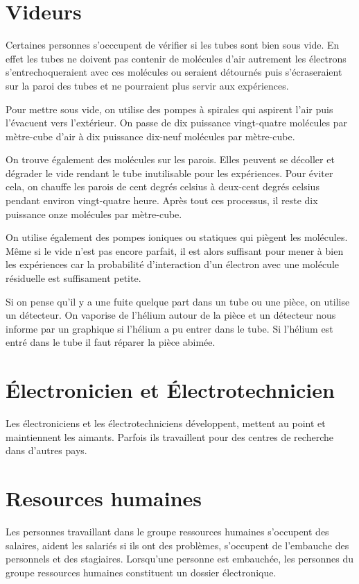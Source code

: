 		\section{Videurs}
			 Certaines personnes s'occcupent de vérifier si les tubes sont bien sous vide. En effet les tubes ne doivent pas contenir de molécules d'air autrement les électrons s'entrechoqueraient avec ces molécules ou seraient détournés puis s'écraseraient sur la paroi des tubes et ne pourraient plus servir aux expériences.
			
			\par Pour mettre sous vide, on utilise des pompes à spirales qui aspirent l'air puis l'évacuent vers l'extérieur. On passe de dix puissance vingt-quatre molécules par mètre-cube d'air à dix puissance dix-neuf molécules par mètre-cube. 
			\par On trouve également des molécules sur les parois. Elles peuvent se décoller et dégrader le vide rendant le tube inutilisable pour les expériences. Pour éviter cela, on chauffe les parois de cent degrés celsius à deux-cent degrés celsius pendant environ vingt-quatre heure. Après tout ces processus, il reste dix puissance onze molécules par mètre-cube. 
			\par On utilise également des pompes ioniques ou statiques qui piègent les molécules. Même si le vide n'est pas encore parfait, il est alors suffisant pour mener à bien les expériences car la probabilité d'interaction d'un électron avec une molécule résiduelle est suffisament petite. 

			\par Si on pense qu'il y a une fuite quelque part dans un tube ou une pièce, on utilise un détecteur. On vaporise de l'hélium autour de la pièce et un détecteur nous informe par un graphique si l'hélium a pu entrer dans le tube. Si l'hélium est entré dans le tube il faut réparer la pièce abimée.  
		
		\section{Électronicien et Électrotechnicien}
			Les électroniciens et les électrotechniciens développent, mettent au point et maintiennent les aimants. Parfois ils travaillent pour des centres de recherche dans d'autres pays.
		
		\section{Resources humaines}
			Les personnes travaillant dans le groupe ressources humaines s'occupent des salaires, aident les salariés si ils ont des problèmes, s'occupent de l'embauche des personnels et des stagiaires. Lorsqu'une personne est embauchée, les personnes du groupe ressources humaines constituent un dossier électronique. 

